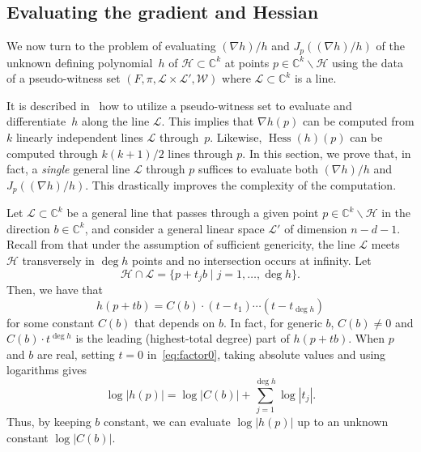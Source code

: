 \documentclass[11pt]{article}
\numberwithin{equation}{section}
\theoremstyle{plain}
\theoremstyle{definition}
\theoremstyle{remark}
\newcommand{\sH}{{\mathcal H}}
\newcommand\bC{{\mathbb C}}
\DeclareMathOperator*{\Hess}{Hess}
\begin{document}
\subsection{Evaluating the gradient and Hessian}
\label{subsec:evaluating}

We now turn to the problem of evaluating $(\nabla h)/h$ and $J_{p}((\nabla h)/h)$ of the unknown defining polynomial~$h$ of $\sH \subset \bC^{k}$ at points $p\in \bC^{k}\smallsetminus \sH$ using the data of a pseudo-witness set $(F, \pi, \mathcal{L}\times\mathcal L', \mathcal{W})$ where $\mathcal{L}\subset\bC^k$ is a line. 

It is described in~\cite{ImplicitPolynomials}
how to utilize a pseudo-witness set to
evaluate and differentiate~$h$ along the line $\mathcal{L}$. This implies that $\nabla h(p)$ can be computed from $k$ linearly independent lines $\mathcal{L}$ through~$p$. Likewise, $\Hess(h)(p)$ can be computed through $k(k+1)/2$ lines through $p$. In this section, we prove that, in fact, a \emph{single} general line $\mathcal{L}$ through $p$ suffices to evaluate both $(\nabla h)/h$ and $J_{p}((\nabla h)/h)$. This drastically improves the complexity of the computation.

Let $\mathcal L\subset \bC^k$ be a general line that passes through a given point $p\in\bC^k \smallsetminus \mathcal{H}$ in the direction $b\in \bC^{k}$, and consider a general linear space $\mathcal L'$ of dimension $n-d-1$. Recall from  that under the assumption of sufficient genericity, the line $\mathcal{L}$ meets $\sH$ transversely in $\deg h$ points and no intersection occurs at infinity. Let 
\begin{equation*}
\sH \cap \mathcal L = \{p+t_j b\mid j=1,\ldots,\deg h\}.
\end{equation*}
Then, we have that
\begin{equation}\label{eq:factor0}
    h(p+tb) = C(b)\cdot (t-t_1)\cdots (t - t_{\deg h})
\end{equation}
for some constant $C(b)$ that depends
on $b$.  
In fact, for generic $b$, 
$C(b)\neq0$ and $C(b)\cdot t^{\deg h}$ is the leading (highest-total degree) part of $h(p+tb)$. 
When $p$ and $b$ are real, setting $t = 0$ in~\eqref{eq:factor0}, taking absolute values and using logarithms gives
\begin{equation}\label{eq:factor0_log}
    \log |h(p)| = \log |C(b)| +\sum_{j=1}^{\deg h} \log |t_j| .
\end{equation}
Thus, by keeping $b$ constant, we can evaluate $\log |h(p)| $ up to an unknown constant $\log |C(b)| $.
\end{document}
